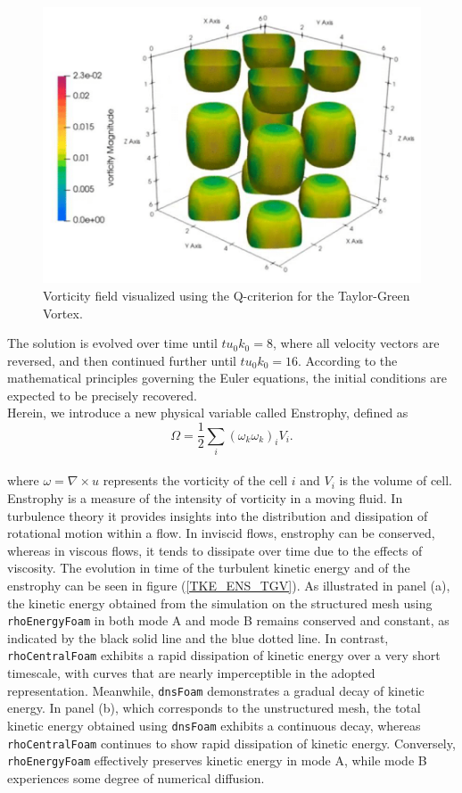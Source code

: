 \documentclass[a5paper]{sapthesis}
\begin{document}
	\begin{figure}[h]
		\centering
		\includegraphics[width=0.7\linewidth]{Figures/TGV_Qcriterion}
		\caption{Vorticity field visualized using the Q-criterion for the Taylor-Green Vortex.}
		\label{TGV_Qcriterion}
	\end{figure}
	The solution is evolved over time until $t u_0 k_0 = 8$, where all velocity vectors are reversed, and then continued further until $t u_0 k_0 = 16$. According to the mathematical principles governing the Euler equations, the initial conditions are expected to be precisely recovered.
	\\
	Herein, we introduce a new physical variable called Enstrophy, defined as
	\begin{equation}
		\Omega = \frac{1}{2} \sum_i (\omega_k \omega_k)_i V_i.
	\end{equation}
	\\
	where $\omega = \nabla \times u$ represents the vorticity of the cell $i$ and $V_i$ is the volume of cell. Enstrophy is a measure of the intensity of vorticity in a moving fluid. In turbulence theory it provides insights into the distribution and dissipation of rotational motion within a flow. In inviscid flows, enstrophy can be conserved, whereas in viscous flows, it tends to dissipate over time due to the effects of viscosity.	The evolution in time of the turbulent kinetic energy and of the enstrophy can be seen in figure (\ref{TKE_ENS_TGV}). As illustrated in panel (a), the kinetic energy obtained from the simulation on the structured mesh using \texttt{rhoEnergyFoam} in both mode A and mode B remains conserved and constant, as indicated by the black solid line and the blue dotted line. In contrast, \texttt{rhoCentralFoam} exhibits a rapid dissipation of kinetic energy over a very short timescale, with curves that are nearly imperceptible in the adopted representation. Meanwhile, \texttt{dnsFoam} demonstrates a gradual decay of kinetic energy. In panel (b), which corresponds to the unstructured mesh, the total kinetic energy obtained using \texttt{dnsFoam} exhibits a continuous decay, whereas \texttt{rhoCentralFoam} continues to show rapid dissipation of kinetic energy. Conversely, \texttt{rhoEnergyFoam} effectively preserves kinetic energy in mode A, while mode B experiences some degree of numerical diffusion.
\end{document}
